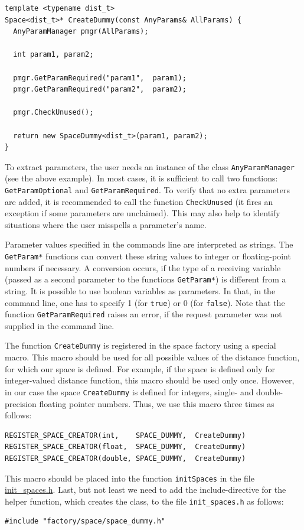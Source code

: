 \documentclass[runningheads,a4paper]{llncs}
\newcommand{\replocfile}{https://github.com/searchivarius/NonMetricSpaceLib/blob/develop/}
\newcommand{\ttt}[1]{\texttt{#1}}
\begin{document}
\begin{verbatim}
template <typename dist_t>
Space<dist_t>* CreateDummy(const AnyParams& AllParams) {
  AnyParamManager pmgr(AllParams);

  int param1, param2;

  pmgr.GetParamRequired("param1",  param1);
  pmgr.GetParamRequired("param2",  param2);

  pmgr.CheckUnused();

  return new SpaceDummy<dist_t>(param1, param2);
}
\end{verbatim}
To extract parameters, the user needs an instance of the class \ttt{AnyParamManager} (see the above example).
In most cases, it is sufficient to call two functions: \ttt{GetParamOptional} and
\ttt{GetParamRequired}.
To verify that no extra parameters are added, it is recommended to call the function \ttt{CheckUnused}
(it fires an exception if some parameters are unclaimed).
This may also help to identify situations where the user misspells 
a parameter's name.


Parameter values specified in the commands line are interpreted as strings.
The \ttt{GetParam*} functions can convert these string values
to integer or floating-point numbers if necessary.
A conversion occurs, if the type of a receiving variable (passed as a second parameter
to the functions \ttt{GetParam*}) is different from a string.
It is possible to use boolean variables as parameters.
In that, in the command line, one has to specify 1 (for \ttt{true}) or 0 (for \ttt{false}).
Note that the function \ttt{GetParamRequired} raises an error, 
if the request parameter was not supplied in the command line.

The function \ttt{CreateDummy} is registered in the space factory using a special macro.
This macro should be used for all possible values of the distance function,
for which our space is defined. For example, if the space is defined
only for integer-valued distance function, this macro should be used only once.
However, in our case the space \ttt{CreateDummy} is defined for integers,
single- and double-precision floating pointer numbers. Thus, we use this macro
three times as follows:
\begin{verbatim}
REGISTER_SPACE_CREATOR(int,    SPACE_DUMMY,  CreateDummy)
REGISTER_SPACE_CREATOR(float,  SPACE_DUMMY,  CreateDummy)
REGISTER_SPACE_CREATOR(double, SPACE_DUMMY,  CreateDummy)
\end{verbatim}

This macro should be placed into the function \ttt{initSpaces} in the 
file 
\href{\replocfile similarity_search/include/factory/init\_spaces.h}{init\_spaces.h}.
Last, but not least we need to add the include-directive
for the helper function, which creates
the class, to the file \ttt{init\_spaces.h} as follows:
\begin{verbatim}
#include "factory/space/space_dummy.h"
\end{verbatim}
\end{document}
